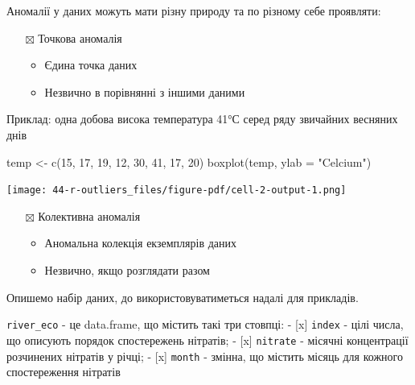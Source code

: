 \documentclass[
  letterpaper,
  DIV=11,
  numbers=noendperiod]{scrreprt}
\newenvironment{Shaded}{\begin{snugshade}}{\end{snugshade}}
\newcommand{\AttributeTok}[1]{\textcolor[rgb]{0.40,0.45,0.13}{#1}}
\newcommand{\DecValTok}[1]{\textcolor[rgb]{0.68,0.00,0.00}{#1}}
\newcommand{\FunctionTok}[1]{\textcolor[rgb]{0.28,0.35,0.67}{#1}}
\newcommand{\NormalTok}[1]{\textcolor[rgb]{0.00,0.23,0.31}{#1}}
\newcommand{\OtherTok}[1]{\textcolor[rgb]{0.00,0.23,0.31}{#1}}
\newcommand{\StringTok}[1]{\textcolor[rgb]{0.13,0.47,0.30}{#1}}
\providecommand{\tightlist}{%
  \setlength{\itemsep}{0pt}\setlength{\parskip}{0pt}}\usepackage{longtable,booktabs,array}
\begin{document}
Аномалії у даних можуть мати різну природу та по різному себе проявляти:

\begin{itemize}
\tightlist
\item[$\boxtimes$]
  Точкова аномалія

  \begin{itemize}
  \tightlist
  \item
    Єдина точка даних
  \item
    Незвично в порівнянні з іншими даними
  \end{itemize}
\end{itemize}

Приклад: одна добова висока температура 41°С серед ряду звичайних
весняних днів

\begin{Shaded}
\begin{Highlighting}[]
\NormalTok{temp }\OtherTok{\textless{}{-}} \FunctionTok{c}\NormalTok{(}\DecValTok{15}\NormalTok{, }\DecValTok{17}\NormalTok{, }\DecValTok{19}\NormalTok{, }\DecValTok{12}\NormalTok{, }\DecValTok{30}\NormalTok{, }\DecValTok{41}\NormalTok{, }\DecValTok{17}\NormalTok{, }\DecValTok{20}\NormalTok{)}
\FunctionTok{boxplot}\NormalTok{(temp, }\AttributeTok{ylab =} \StringTok{"Celcium"}\NormalTok{)}
\end{Highlighting}
\end{Shaded}

\texttt{[image: 44-r-outliers\_files/figure-pdf/cell-2-output-1.png]}

\begin{itemize}
\tightlist
\item[$\boxtimes$]
  Колективна аномалія

  \begin{itemize}
  \tightlist
  \item
    Аномальна колекція екземплярів даних
  \item
    Незвично, якщо розглядати разом
  \end{itemize}
\end{itemize}

Опишемо набір даних, до використовуватиметься надалі для прикладів.

\texttt{river\_eco} - це data.frame, що містить такі три стовпці: -
{[}x{]} \texttt{index} - цілі числа, що описують порядок спостережень
нітратів; - {[}x{]} \texttt{nitrate} - місячні концентрації розчинених
нітратів у річці; - {[}x{]} \texttt{month} - змінна, що містить місяць
для кожного спостереження нітратів
\end{document}
